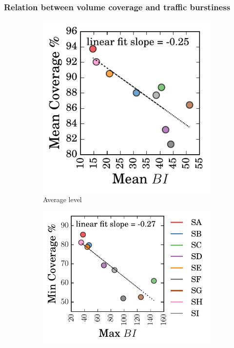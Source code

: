 
\subsubsection{Relation between volume coverage and traffic burstiness}

\begin{figure}[!tb]
\centering
		\centering
        \begin{subfigure}[b]{0.42\textwidth}
        \centering
                \includegraphics[width=\textwidth]{gfx/chap2/bi_cvg_mean.pdf}
                \caption{Average level}
                \label{fig:bi_cvg_mean}
        \end{subfigure}
        \hfill
        \begin{subfigure}[b]{0.53\textwidth}
                \includegraphics[width=\textwidth]{gfx/chap2/bi_cvg_worst.pdf}

\end{subfigure}
\end{figure}
